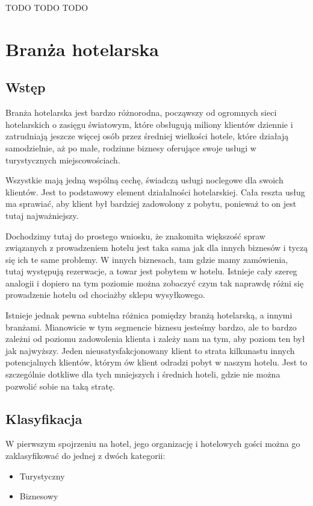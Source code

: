 \documentclass[a4paper,onecolumn,oneside,11pt,wide,floatssmall]{mwrep}
\theoremstyle{definition}
\theoremstyle{plain}%
\theoremstyle{remark}
\begin{document}
TODO TODO TODO


\section{Branża hotelarska}

\subsection{Wstęp}

Branża hotelarska jest bardzo różnorodna, począwszy od ogromnych sieci
hotelarskich o zasięgu światowym, które obsługują miliony klientów dziennie i zatrudniają
 jeszcze więcej osób przez średniej wielkości hotele, które działają
 samodzielnie, aż po małe, rodzinne biznesy oferujące swoje usługi
 w turystycznych miejscowościach.
 
  Wszystkie mają jedną wspólną cechę,
 świadczą usługi noclegowe dla swoich klientów. Jest to podstawowy element
 działalności hotelarskiej. Cała reszta usług ma sprawiać, aby klient był
 bardziej zadowolony z pobytu, ponieważ to on jest tutaj najważniejszy.
 
  Dochodzimy tutaj do prostego wniosku, że znakomita
 większość spraw związanych z prowadzeniem hotelu jest taka sama jak dla innych
 biznesów i tyczą się ich te same problemy. W innych biznesach, tam gdzie mamy
 zamówienia, tutaj występują rezerwacje, a towar jest pobytem w hotelu. Istnieje
 cały szereg analogii i dopiero na tym poziomie można zobaczyć czym tak naprawdę
 różni się prowadzenie hotelu od chociażby sklepu wysyłkowego.
 
 Istnieje jednak pewna subtelna różnica pomiędzy branżą hotelarską, a innymi
 branżami. Mianowicie w tym segmencie biznesu jesteśmy bardzo, ale to bardzo
 zależni od poziomu zadowolenia klienta i zależy nam na tym, aby poziom ten był
 jak najwyższy. Jeden nieusatysfakcjonowany klient to strata kilkunastu
 innych potencjalnych klientów, którym ów klient odradzi pobyt w naszym hotelu.
 Jest to szczególnie dotkliwe dla tych mniejszych i średnich hoteli, gdzie nie
 można pozwolić sobie na taką stratę.

\subsection{Klasyfikacja}
W pierwszym spojrzeniu na hotel, jego organizację i hotelowych gości można go
zaklasyfikować do jednej z dwóch kategorii:
\begin{itemize}
  \item Turystyczny
  \item Biznesowy 
\end{itemize}
\end{document}
